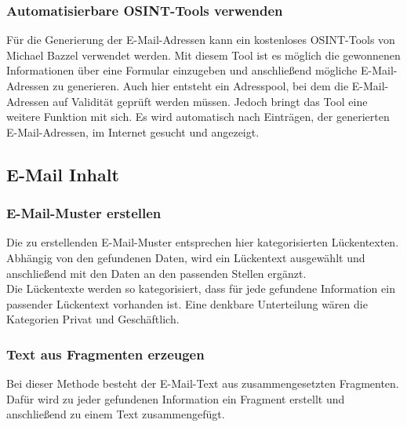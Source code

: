		\subsubsection{Automatisierbare OSINT-Tools verwenden}
		Für die Generierung der E-Mail-Adressen kann ein kostenloses OSINT-Tools von Michael Bazzel verwendet werden. Mit diesem Tool ist es möglich die gewonnenen Informationen über eine Formular einzugeben und anschließend mögliche E-Mail-Adressen zu generieren. Auch hier entsteht ein Adresspool, bei dem die E-Mail-Adressen auf Validität geprüft werden müssen. Jedoch bringt das Tool eine weitere Funktion mit sich. Es wird automatisch nach Einträgen, der generierten E-Mail-Adressen, im Internet gesucht und angezeigt. 
	\subsection{E-Mail Inhalt}
		\subsubsection{E-Mail-Muster erstellen}
		Die zu erstellenden E-Mail-Muster entsprechen hier kategorisierten Lückentexten. Abhängig von den gefundenen Daten, wird ein Lückentext ausgewählt und anschließend mit den Daten an den passenden Stellen ergänzt.\\
		Die Lückentexte werden so kategorisiert, dass für jede gefundene Information ein passender Lückentext vorhanden ist. Eine denkbare Unterteilung wären die Kategorien Privat und Geschäftlich.
		\subsubsection{Text aus Fragmenten erzeugen}
		Bei dieser Methode besteht der E-Mail-Text aus zusammengesetzten Fragmenten. Dafür wird zu jeder gefundenen Information ein Fragment erstellt und anschließend zu einem Text zusammengefügt.
		
		
		
